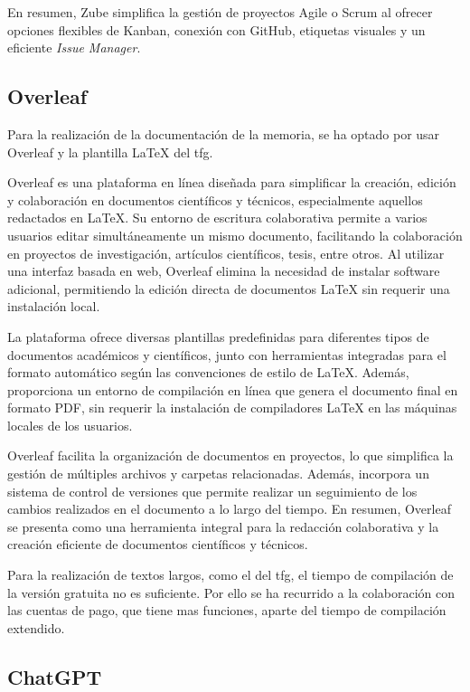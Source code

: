 En resumen, Zube simplifica la gestión de proyectos Agile o Scrum al ofrecer opciones flexibles de Kanban, conexión con GitHub, etiquetas visuales y un eficiente \textit{Issue Manager}.

\subsection{Overleaf}

Para la realización de la documentación de la memoria, se ha optado por usar Overleaf y la plantilla LaTeX del \acrshort{tfg}.

Overleaf es una plataforma en línea diseñada para simplificar la creación, edición y colaboración en documentos científicos y técnicos, especialmente aquellos redactados en LaTeX. Su entorno de escritura colaborativa permite a varios usuarios editar simultáneamente un mismo documento, facilitando la colaboración en proyectos de investigación, artículos científicos, tesis, entre otros. Al utilizar una interfaz basada en web, Overleaf elimina la necesidad de instalar software adicional, permitiendo la edición directa de documentos LaTeX sin requerir una instalación local.

La plataforma ofrece diversas plantillas predefinidas para diferentes tipos de documentos académicos y científicos, junto con herramientas integradas para el formato automático según las convenciones de estilo de LaTeX. Además, proporciona un entorno de compilación en línea que genera el documento final en formato PDF, sin requerir la instalación de compiladores LaTeX en las máquinas locales de los usuarios.

Overleaf facilita la organización de documentos en proyectos, lo que simplifica la gestión de múltiples archivos y carpetas relacionadas. Además, incorpora un sistema de control de versiones que permite realizar un seguimiento de los cambios realizados en el documento a lo largo del tiempo. En resumen, Overleaf se presenta como una herramienta integral para la redacción colaborativa y la creación eficiente de documentos científicos y técnicos.

Para la realización de textos largos, como el del \acrshort{tfg}, el tiempo de compilación de la versión gratuita no es suficiente. Por ello se ha recurrido a la colaboración con las cuentas de pago, que tiene mas funciones, aparte del tiempo de compilación extendido.

\subsection{ChatGPT}

